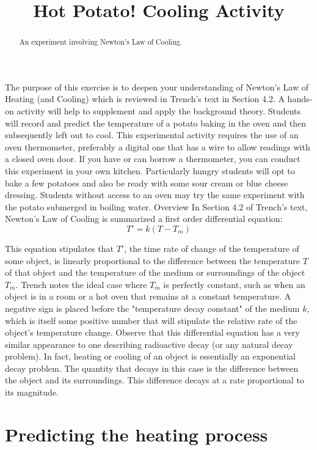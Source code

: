 \documentclass{ximera}
\title{Hot Potato! Cooling Activity}
\begin{document}
 
\begin{abstract}
An experiment involving Newton's Law of Cooling.
\end{abstract}
 
\maketitle
 
The purpose of this exercise is to deepen your understanding of Newton's Law of Heating (and Cooling) which is reviewed in Trench's text in Section 4.2.  A hands-on activity will help to supplement and apply the background theory.  Students will record and predict the temperature of a potato baking in the oven and then subsequently left out to cool.  This experimental activity requires the use of an oven thermometer, preferably a digital one that has a wire to allow readings with a closed oven door.  If you have or can borrow a thermometer, you can conduct this experiment in your own kitchen.  Particularly hungry students will opt to bake a few potatoes and also be ready with some sour cream or blue cheese dressing.  Students without access to an oven may try the same experiment with the potato submerged in boiling water.
Overview
In Section 4.2 of Trench's text, Newton's Law of Cooling is summarized a first order differential equation:
\[
T'=k(T-T_m)
\]
 
This equation stipulates that $T'$, the time rate of change of the temperature of some object, is linearly proportional to the difference between the temperature  $T$ of that object and the temperature of the medium or surroundings of the object $T_m$.  Trench notes the ideal case where  $T_m$ is perfectly constant, such as when an object is in a room or a hot oven that remains at a constant temperature.  A negative sign is placed before the "temperature decay constant" of the medium $k$, which is itself some positive number that will stipulate the relative rate of the object's temperature change.  Observe that this differential equation has a very similar appearance to one describing radioactive decay (or any natural decay problem).  In fact, heating or cooling of an object is essentially an exponential decay problem.  The quantity that decays in this case is the difference between the object and its surroundings.  This difference decays at a rate proportional to its magnitude.
 
\section*{Predicting the heating process}
 
\end{document}
